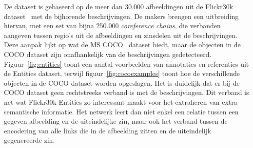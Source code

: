 De dataset is gebaseerd op de meer dan 30.000 afbeeldingen uit de Flickr30k dataset~\cite{Young2014} met de bijhorende beschrijvingen. De makers brengen een uitbreiding hiervan, met een set van bijna 250.000 \emph{coreference chains}, die verbanden aangeven tussen regio's uit de afbeeldingen en zinsdelen uit de beschrijvingen. Deze aanpak lijkt op wat de MS COCO~\cite{Lin2014} dataset biedt, maar de objecten in de COCO dataset zijn onafhankelijk van de beschrijvingen gedetecteerd. Figuur~\ref{fig:entities} toont een aantal voorbeelden van annotaties en referenties uit de Entities dataset, terwijl figuur~\ref{fig:cocoexamples} toont hoe de verschillende objecten in de COCO dataset worden opgeslagen. Het is duidelijk dat er bij de COCO dataset geen rechtstreeks verband is met de beschrijvingen. Dit verband is net wat Flickr30k Entities zo interessant maakt voor het extraheren van extra semantische informatie. Het netwerk leert dan niet enkel een relatie tussen een gegeven afbeelding en de uiteindelijke zin, maar ook het verband tussen de encodering van alle links die in de afbeelding zitten en de uiteindelijk gegenereerde zin.

